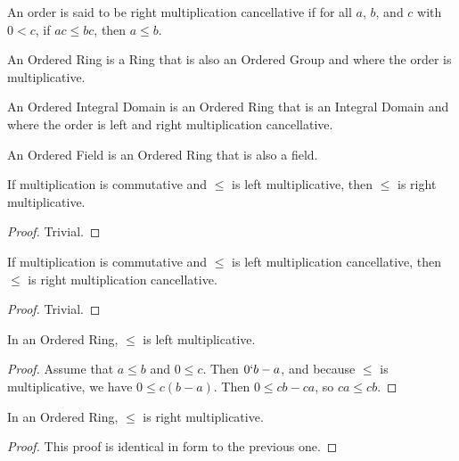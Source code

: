 \documentclass[../../math.tex]{subfiles}
\begin{document}
\begin{class}
    An order is said to be right multiplication cancellative if for all $a$,
    $b$, and $c$ with $0 < c$, if $ac \leq bc$, then $a \leq b$.
\end{class}

\begin{class}
    An Ordered Ring is a Ring that is also an Ordered Group and where the order
    is multiplicative.
\end{class}

\begin{class}
    An Ordered Integral Domain is an Ordered Ring that is an Integral Domain and
    where the order is left and right multiplication cancellative.
\end{class}

\begin{class}
    An Ordered Field is an Ordered Ring that is also a field.
\end{class}

\begin{instance}
    If multiplication is commutative and $\leq$ is left multiplicative, then
    $\leq$ is right multiplicative.
\end{instance}
\begin{proof}
    Trivial.
\end{proof}

\begin{instance}
    If multiplication is commutative and $\leq$ is left multiplication
    cancellative, then $\leq$ is right multiplication cancellative.
\end{instance}
\begin{proof}
    Trivial.
\end{proof}

\begin{instance}
    In an Ordered Ring, $\leq$ is left multiplicative.
\end{instance}
\begin{proof}
    Assume that $a \leq b$ and $0 \leq c$.  Then $0 \lq b - a$, and because
    $\leq$ is multiplicative, we have $0 \leq c(b - a)$.  Then $0 \leq cb - ca$,
    so $ca \leq cb$.
\end{proof}

\begin{instance}
    In an Ordered Ring, $\leq$ is right multiplicative.
\end{instance}
\begin{proof}
    This proof is identical in form to the previous one.
\end{proof}
\end{document}
